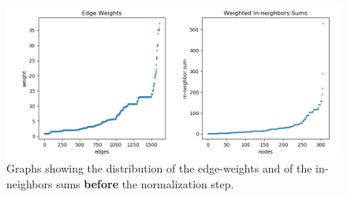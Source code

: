   \begin{figure}[h!]
     \centering
     \includegraphics[width=\textwidth]{img/prenorm.png}
     \caption{Graphs showing the distribution of the edge-weights and of the in-neighbors sums \textbf{before} the normalization step.}
     \label{fig:weight_prenorm}
 \end{figure}
 
